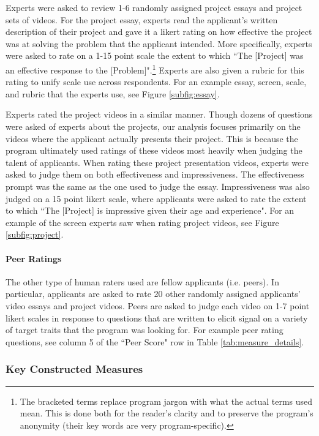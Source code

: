 Experts were asked to review 1-6 randomly assigned project essays and project sets of videos. For the project essay, experts read the applicant's written description of their project and gave it a likert rating on how effective the project was at solving the problem that the applicant intended. More specifically, experts were asked to rate on a 1-15 point scale the extent to which ``The [Project] was an effective response to the [Problem]".\footnote{The bracketed terms replace program jargon with what the actual terms used mean. This is done both for the reader's clarity and to preserve the program's anonymity (their key words are very program-specific).} Experts are also given a rubric for this rating to unify scale use across respondents. For an example essay, screen, scale, and rubric that the experts use, see Figure \ref{subfig:essay}. 

Experts rated the project videos in a similar manner. Though dozens of questions were asked of experts about the projects, our analysis focuses primarily on the videos where the applicant actually presents their project. This is because the program ultimately used ratings of these videos most heavily when judging the talent of applicants. When rating these project presentation videos, experts were asked to judge them on both effectiveness and impressiveness. The effectiveness prompt was the same as the one used to judge the essay. Impressiveness was also judged on a 15 point likert scale, where applicants were asked to rate the extent to which ``The [Project] is impressive given their age and experience". For an example of the screen experts saw when rating project videos, see Figure \ref{subfig:project}. 

\paragraph{Peer Ratings}

The other type of human raters used are fellow applicants (i.e. peers). In particular, applicants are asked to rate 20 other randomly assigned applicants' video essays and project videos. Peers are asked to judge each video on 1-7 point likert scales in response to questions that are written to elicit signal on a variety of target traits that the program was looking for. For example peer rating questions, see column 5 of the ``Peer Score" row in Table \ref{tab:measure_details}. 

\subsubsection{Key Constructed Measures}

